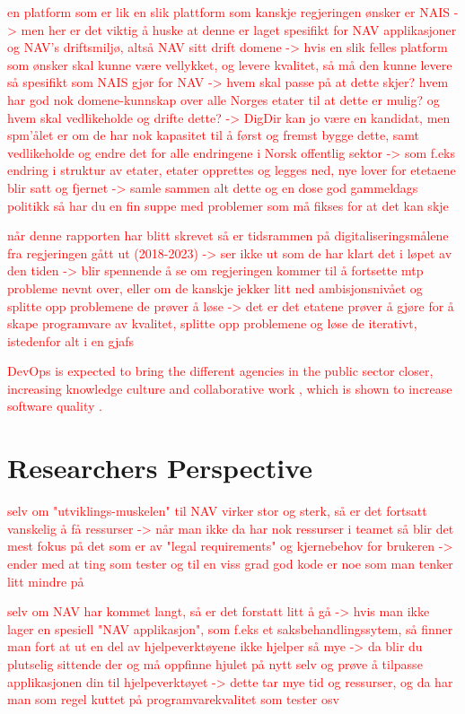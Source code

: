 \textcolor{red}{en platform som er lik en slik plattform som kanskje regjeringen ønsker er NAIS -> men her er det viktig å huske at denne er laget spesifikt for NAV applikasjoner og NAV's driftsmiljø, altså NAV sitt drift domene -> hvis en slik felles platform som ønsker skal kunne være vellykket, og levere kvalitet, så må den kunne levere så spesifikt som NAIS gjør for NAV -> hvem skal passe på at dette skjer? hvem har god nok domene-kunnskap over alle Norges etater til at dette er mulig? og hvem skal vedlikeholde og drifte dette? -> DigDir kan jo være en kandidat, men spm'ålet er om de har nok kapasitet til å først og fremst bygge dette, samt vedlikeholde og endre det for alle endringene i Norsk offentlig sektor -> som f.eks endring i struktur av etater, etater opprettes og legges ned, nye lover for etetaene blir satt og fjernet -> samle sammen alt dette og en dose god gammeldags politikk så har du en fin suppe med problemer som må fikses for at det kan skje}

\textcolor{red}{når denne rapporten har blitt skrevet så er tidsrammen på digitaliseringsmålene fra regjeringen gått ut (2018-2023) -> ser ikke ut som de har klart det i løpet av den tiden -> blir spennende å se om regjeringen kommer til å fortsette mtp probleme nevnt over, eller om de kanskje jekker litt ned ambisjonsnivået og splitte opp problemene de prøver å løse -> det er det etatene prøver å gjøre for å skape programvare av kvalitet, splitte opp problemene og løse de iterativt, istedenfor alt i en gjafs}

\textcolor{red}{DevOps is expected to bring the different agencies in the public sector closer, increasing knowledge culture and collaborative work \cite{mm_2021}, which is shown to increase software quality \cite{smm_2018}.}


\section{Researchers Perspective}
\textcolor{red}{selv om "utviklings-muskelen" til NAV virker stor og sterk, så er det fortsatt vanskelig å få ressurser -> når man ikke da har nok ressurser i teamet så blir det mest fokus på det som er av "legal requirements" og kjernebehov for brukeren -> ender med at ting som tester og til en viss grad god kode er noe som man tenker litt mindre på}

\textcolor{red}{selv om NAV har kommet langt, så er det forstatt litt å gå -> hvis man ikke lager en spesiell "NAV applikasjon", som f.eks et saksbehandlingssytem, så finner man fort at ut en del av hjelpeverktøyene ikke hjelper så mye -> da blir du plutselig sittende der og må oppfinne hjulet på nytt selv og prøve å tilpasse applikasjonen din til hjelpeverktøyet -> dette tar mye tid og ressurser, og da har man som regel kuttet på programvarekvalitet som tester osv}

